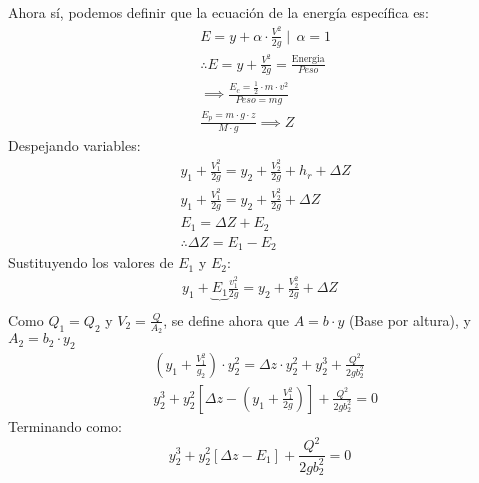 Ahora sí, podemos definir que la ecuación de la energía específica es:
\begin{align*}
    &E= y + \alpha\cdot \frac{V^2}{2g}\mid\, \alpha =1\\
    &\therefore E= y + \frac{V^2}{2g} = \frac{\text{Energia}}{Peso}\\
    &\implies \frac{E_c = \frac{1}{2}\cdot m\cdot v^2}{Peso = mg}\\
    & \frac{E_p = m \cdot g \cdot z}{M\cdot g}\implies Z
\end{align*}
Despejando variables:
\begin{align*}
    &y_1+ \frac{V_1^2}{2g} = y_2 + \frac{V_2^2}{2g} + h_r+\Delta Z\\
    &y_1 + \frac{V_1^2}{2g} = y_2 + \frac{V_2^2}{2g} +\Delta Z\\
    &E_1 = \Delta Z + E_2\\
    &\therefore \Delta Z = E_1 - E_2
\end{align*}
Sustituyendo los valores de $E_1$ y $E_2$:
\begin{align*}
    y_1+ \underbrace{E_1}{\frac{v_1^2}{2g}} = y_2 + \frac{V_2^2}{2g} +\Delta Z\\
\end{align*}
Como $Q_1=Q_2$ y $V_2=\frac{Q}{A_2}$, se define ahora que $A=b\cdot y$ (Base por altura), y $A_2=b_2\cdot y_2$
\begin{align*}
    &\left(y_1 + \frac{V_1^2}{g_2}\right)\cdot y_2^2 =\Delta z\cdot y_2^2 + y_2^3 + \frac{Q^2}{2gb^2_2}\\
    &y_2^3 +y_2^2\left[\Delta z -\left(y_1 +\frac{V_1^2}{2g} \right) \right] + \frac{Q^2}{2gb_2^2} = 0
\end{align*}
Terminando como:
\begin{equation}
    y_2^3 +y_2^2\left[\Delta z - E_1 \right] + \frac{Q^2}{2gb_2^2} = 0
\end{equation}


